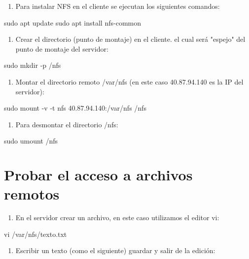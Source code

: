 \begin{enumerate}
\item Para instalar NFS en el cliente se ejecutan los siguientes comandos:
\end{enumerate}

\begin{SourceCode}
sudo apt update
sudo apt install nfs-common
\end{SourceCode}

\begin{enumerate}
\item Crear el directorio (punto de montaje) en el cliente. el cual será "espejo" del punto de montaje del servidor:
\end{enumerate}

\begin{SourceCode}
sudo mkdir -p /nfs
\end{SourceCode}

\begin{enumerate}
\item Montar el directorio remoto /var/nfs (en este caso 40.87.94.140 es la IP del servidor):
\end{enumerate}

\begin{SourceCode}
sudo mount -v -t nfs 40.87.94.140:/var/nfs /nfs
\end{SourceCode}

\begin{enumerate}
\item Para desmontar el directorio /nfs:
\end{enumerate}

\begin{SourceCode}
sudo umount /nfs
\end{SourceCode}

\section{Probar el acceso a archivos remotos}

\begin{enumerate}
\item En el servidor crear un archivo, en este caso utilizamos el editor vi:
\end{enumerate}

\begin{SourceCode}
vi /var/nfs/texto.txt
\end{SourceCode}

\begin{enumerate}
\item Escribir un texto (como el siguiente) guardar y salir de la edición:
\end{enumerate}

